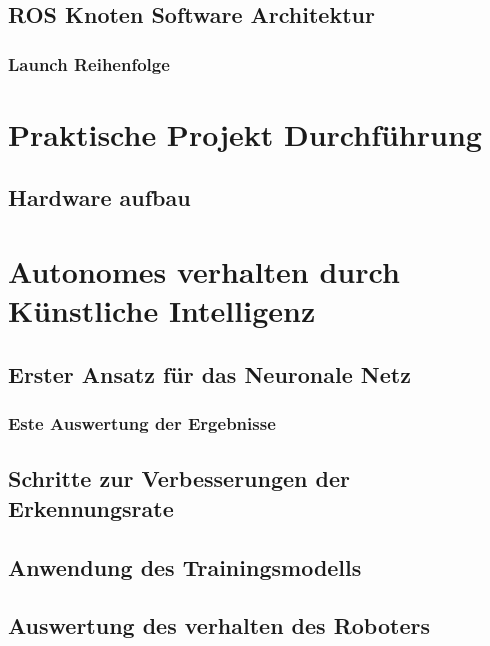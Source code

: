 \documentclass[conference]{IEEEtran}
\begin{document}
\subsection{ROS Knoten Software Architektur}%
\subsubsection{ Launch Reihenfolge}%

\section{Praktische Projekt Durchführung }

\subsection{Hardware aufbau}%


\section{Autonomes verhalten durch Künstliche Intelligenz  }	%

\subsection{Erster Ansatz für das Neuronale Netz}	%
\subsubsection{Este Auswertung der Ergebnisse}	%
\subsection{Schritte zur Verbesserungen der Erkennungsrate} %
\subsection{Anwendung des Trainingsmodells } %
\subsection {Auswertung des verhalten des Roboters}	%
\end{document}
